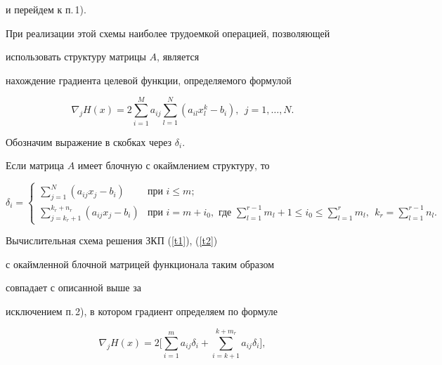и перейдем к п.\,1).





При реализации этой схемы наиболее трудоемкой операцией, позволяющей


использовать структуру матрицы $A$, является


нахождение градиента целевой функции, определяемого формулой


\begin{equation}\label{c1}


\nabla_{j} H(x)=2\sum\limits_{i=1}^{M}a_{ij}\sum\limits_{l=1}^{N}


(a_{il}x_l^k-b_i),\ \ j=1,\dotsc,N.


\end{equation}


Обозначим выражение в скобках через $\delta_i$.


Если матрица $A$ имеет блочную с окаймлением структуру, то


\begin{equation}\label{delb}


\delta_{i}=


\begin{cases}


\sum\limits_{j=1}^{N}(a_{ij}x_{j}-b_{i})&\text{при } i\leq m;\\


\sum\limits_{j=k_r+1}^{k_r+n_{r}}(a_{ij}x_{j}-b_{i})&\text{при }


i=m+i_{0},\text{ где }


\sum\limits_{l=1}^{r-1}m_{l}+1\leq i_{0}\leq \sum\limits_{l=1}^{r}m_{l},


\ \ k_r=\sum\limits_{l=1}^{r-1}n_{l}.


\end{cases}


\end{equation}


Вычислительная схема решения ЗКП (\ref{t1}), (\ref{t2})


с окаймленной блочной матрицей функционала таким образом


совпадает с описанной выше за


исключением п.\,2), в котором градиент определяем по формуле


\begin{equation}\label{k2} \nabla_{j}


H(x)=2\bigg[\sum\limits_{i=1}^{m}a_{ij}\delta_{i}+\sum\limits_{i=k+1}


^{k+m_{r}}a_{ij}\delta_{i}\bigg],


\end{equation}



